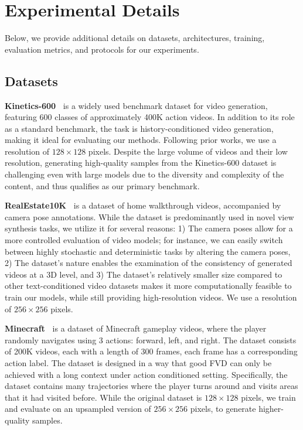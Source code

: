 \section{Experimental Details}
\label{app:exp_details}

Below, we provide additional details on datasets, architectures, training, evaluation metrics, and protocols for our experiments.

\subsection{Datasets}
\label{app:exp_details_datasets}

\textbf{Kinetics-600~\cite{kay2017kinetics}} is a widely used benchmark dataset for video generation, featuring 600 classes of approximately 400K action videos. In addition to its role as a standard benchmark, the task is history-conditioned video generation, making it ideal for evaluating our methods. Following prior works, we use a resolution of $128 \times 128$ pixels. Despite the large volume of videos and their low resolution, generating high-quality samples from the Kinetics-600 dataset is challenging even with large models due to the diversity and complexity of the content, and thus qualifies as our primary benchmark.


\textbf{RealEstate10K~\cite{zhou2018stereo}} is a dataset of home walkthrough videos, accompanied by camera pose annotations. While the dataset is predominantly used in novel view synthesis tasks, we utilize it for several reasons: 1) The camera poses allow for a more controlled evaluation of video models; for instance, we can easily switch between highly stochastic and deterministic tasks by altering the camera poses, 2) The dataset's nature enables the examination of the consistency of generated videos at a 3D level, and 3) The dataset's relatively smaller size compared to other text-conditioned video datasets makes it more computationally feasible to train our models, while still providing high-resolution videos. We use a resolution of $256 \times 256$ pixels.


\textbf{Minecraft~\cite{yan2023temporally}} is a dataset of Minecraft gameplay videos, where the player randomly navigates using 3 actions: forward, left, and right. The dataset consists of 200K videos, each with a length of 300 frames, each frame has a corresponding action label. The dataset is designed in a way that good FVD can only be achieved with a long context under action conditioned setting. Specifically, the dataset contains many trajectories where the player turns around and visits areas that it had visited before.  While the original dataset is $128 \times 128$ pixels, we train and evaluate on an upsampled version of $256 \times 256$ pixels, to generate higher-quality samples. 


